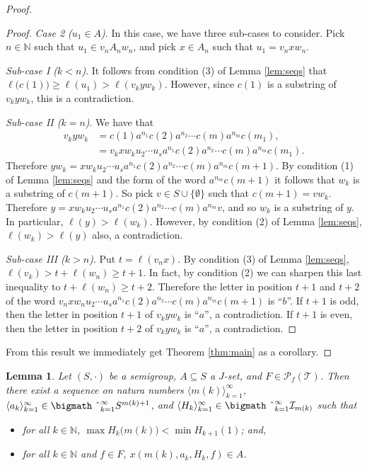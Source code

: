 \documentclass[12pt]{article}
\theoremstyle{plain}
\newtheorem{lem}[thm]{Lemma}
\theoremstyle{definition}
\newcommand{\la}{\langle}
\newcommand{\ra}{\rangle}
\newcommand{\bbN}{\mathbb{N}}
\newcommand{\calI}{\mathcal{I}}
\newcommand{\calT}{\mathcal{T}}
\newcommand{\Pf}{\mathcal{P}_f}
\newcommand{\bigtimes}{\hbox{\bigmath \char'2}}
\begin{document}
\begin{proof}
\begin{proof}
  \textsl{Case 2 ($u_1 \in A$)}. 
  In this case, we have three sub-cases to consider. 
  Pick $n \in \mathbb{N}$ such that $u_1 \in v_nA_nw_n$, and pick
  $x \in A_n$ such that $u_1 = v_nxw_n$.
  
  \textsl{Sub-case I ($k<n$)}. 
  It follows from condition (3) of Lemma \ref{lem:seqs} that
  $\ell\bigl(c(1)\bigr) \ge \ell(u_1) > \ell(v_kyw_k)$.
  However, since $c(1)$ is a substring of $v_kyw_k$, this is a
  contradiction. 

  \textsl{Sub-case II ($k=n$)}.
  We have that 
    \begin{align*}
    v_kyw_k &= c(1)a^{n_1}c(2)a^{n_2} \cdots c(m)a^{n_m}c(m_1), \\
           &= v_kxw_ku_2 \cdots u_sa^{n_1}c(2)a^{n_2} \cdots 
           c(m)a^{n_m}c(m_1).
    \end{align*}
  Therefore $yw_k = xw_ku_2 \cdots u_sa^{n_1}c(2)a^{n_2} \cdots 
  c(m)a^{n_m}c(m+1)$.
  By condition (1) of Lemma \ref{lem:seqs} and the form of the 
  word $a^{n_m}c(m+1)$ it follows that $w_k$ is a substring of
  $c(m+1)$.
  So pick $v \in S\cup\{\emptyset\}$ such that $c(m+1) = vw_k$.
  Therefore $y = xw_ku_2 \cdots u_s a^{n_1}c(2)a^{n_2} \cdots 
  c(m)a^{n_m}v$, and so $w_k$ is a substring of $y$.
  In particular, $\ell(y) > \ell(w_k)$.
  However, by condition (2) of Lemma \ref{lem:seqs}, 
  $\ell(w_k) > \ell(y)$ also, a contradiction. 

  \textsl{Sub-case III ($k>n$)}. 
  Put $t = \ell(v_nx)$. 
  By condition (3) of Lemma \ref{lem:seqs}, $\ell(v_k) > t + 
  \ell(w_n) \ge t+1$. 
  In fact, by condition (2) we can sharpen this last inequality
  to $t + \ell(w_n) \ge t+2$. 
  Therefore the letter in position $t+1$ and $t+2$ of the word
  $v_nxw_nu_2 \cdots u_sa^{n_1}c(2)a^{n_2} \cdots c(m)a^{n_m}c(m+1)$
  is ``$b$''. 
  If $t+1$ is odd, then the letter in position $t+1$ of 
  $v_kyw_k$ is ``$a$'', a contradiction.
  If $t+1$ is even, then the letter in position $t+2$ of 
  $v_kyw_k$ is ``$a$'', a contradiction.
  \end{proof}

From this result we immediately get Theorem \ref{thm:main} 
as a corollary. 


\end{proof}

\begin{lem}
  Let $(S, \cdot)$ be a semigroup, $A \subseteq S$ a $J$-set, and $F
  \in \Pf(\calT)$.
  Then there exist a sequence on natura numbers $\la m(k)
  \ra_{k=1}^\infty$, $\la a_k \ra_{k=1}^\infty \in
  \bigtimes_{k=1}^\infty S^{m(k)+1}$, and $\la H_k \ra_{k=1}^\infty
  \in \bigtimes_{k=1}^\infty \calI_{m(k)}$ such that
  \begin{itemize}
    \item[(1)] for all $k \in \bbN$, $\max H_k\bigl(m(k)\bigr) < \min
      H_{k+1}(1)$; and,

    \item[(2)] for all $k \in \bbN$ and $f \in F$, $x(m(k), a_k, H_k,
      f) \in A$.
  \end{itemize}
\end{lem}
\end{document}
